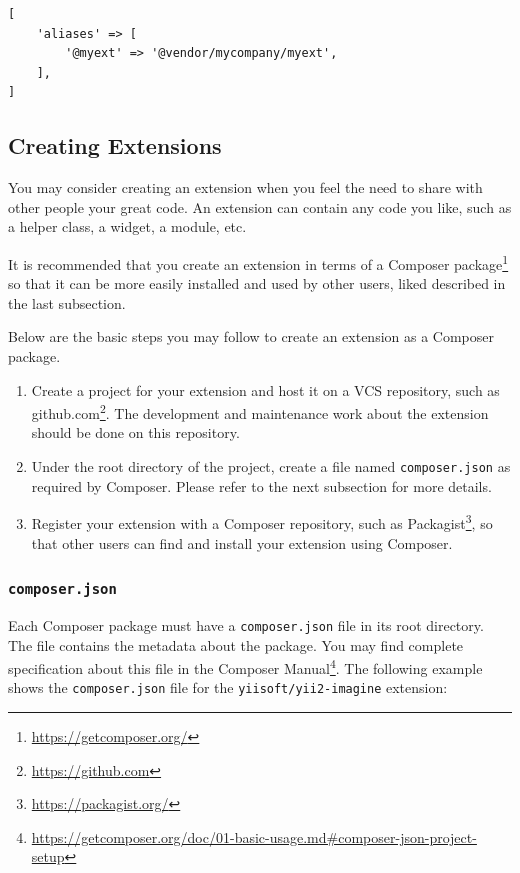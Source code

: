\lstset{language=php}\begin{lstlisting}
[
    'aliases' => [
        '@myext' => '@vendor/mycompany/myext',
    ],
]
\end{lstlisting}
\subsection{Creating Extensions \label{structure-extensions.md::creating-extensions}}
You may consider creating an extension when you feel the need to share with other people your great code.
An extension can contain any code you like, such as a helper class, a widget, a module, etc.

It is recommended that you create an extension in terms of a Composer package\footnote{\url{https://getcomposer.org/}} so that
it can be more easily installed and used by other users, liked described in the last subsection.

Below are the basic steps you may follow to create an extension as a Composer package.

\begin{enumerate}
\item Create a project for your extension and host it on a VCS repository, such as github.com\footnote{\url{https://github.com}}.
The development and maintenance work about the extension should be done on this repository.
\item Under the root directory of the project, create a file named \lstinline|composer.json| as required by Composer. Please
refer to the next subsection for more details.
\item Register your extension with a Composer repository, such as Packagist\footnote{\url{https://packagist.org/}}, so that
other users can find and install your extension using Composer.
\end{enumerate}
\subsubsection{\lstinline|composer.json| \label{structure-extensions.md::composer-json}}
Each Composer package must have a \lstinline|composer.json| file in its root directory. The file contains the metadata about
the package. You may find complete specification about this file in the Composer Manual\footnote{\url{https://getcomposer.org/doc/01-basic-usage.md\#composer-json-project-setup}}.
The following example shows the \lstinline|composer.json| file for the \lstinline|yiisoft/yii2-imagine| extension:

